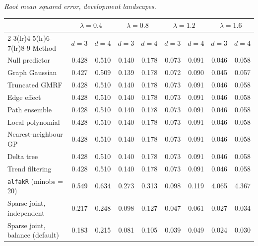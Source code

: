 \par\medskip\noindent\begin{minipage}{\linewidth}
\textit{Root mean squared error, development landscapes.}
\begin{center}
\footnotesize
\setlength{\tabcolsep}{3.5pt}
\begin{tabular}{l*{8}{r}}
\toprule
 & \multicolumn{2}{c}{$\lambda=0.4$} & \multicolumn{2}{c}{$\lambda=0.8$} & \multicolumn{2}{c}{$\lambda=1.2$} & \multicolumn{2}{c}{$\lambda=1.6$} \\
\cmidrule(lr){2-3}\cmidrule(lr){4-5}\cmidrule(lr){6-7}\cmidrule(lr){8-9}
Method & $d=3$ & $d=4$ & $d=3$ & $d=4$ & $d=3$ & $d=4$ & $d=3$ & $d=4$ \\
\midrule
Null predictor & 0.428 & 0.510 & 0.140 & 0.178 & 0.073 & 0.091 & 0.046 & 0.058 \\
Graph Gaussian & 0.427 & 0.509 & 0.139 & 0.178 & 0.072 & 0.090 & 0.045 & 0.057 \\
Truncated GMRF & 0.428 & 0.510 & 0.140 & 0.178 & 0.073 & 0.091 & 0.046 & 0.058 \\
Edge effect & 0.428 & 0.510 & 0.140 & 0.178 & 0.073 & 0.091 & 0.046 & 0.058 \\
Path ensemble & 0.428 & 0.510 & 0.140 & 0.178 & 0.073 & 0.091 & 0.046 & 0.058 \\
Local polynomial & 0.428 & 0.510 & 0.140 & 0.178 & 0.073 & 0.091 & 0.046 & 0.058 \\
Nearest-neighbour GP & 0.428 & 0.510 & 0.140 & 0.178 & 0.073 & 0.091 & 0.046 & 0.058 \\
Delta tree & 0.428 & 0.510 & 0.140 & 0.178 & 0.073 & 0.091 & 0.046 & 0.058 \\
Trend filtering & 0.428 & 0.510 & 0.140 & 0.178 & 0.073 & 0.091 & 0.046 & 0.058 \\
\texttt{alfakR} (minobs = 20) & 0.549 & 0.634 & 0.273 & 0.313 & 0.098 & 0.119 & 4.065 & 4.367 \\
Sparse joint, independent & 0.217 & 0.248 & 0.098 & 0.127 & 0.047 & 0.061 & 0.027 & 0.034 \\
Sparse joint, balance (default) & 0.183 & 0.215 & 0.081 & 0.105 & 0.039 & 0.049 & 0.024 & 0.030 \\
\bottomrule
\end{tabular}
\end{center}
\end{minipage}


